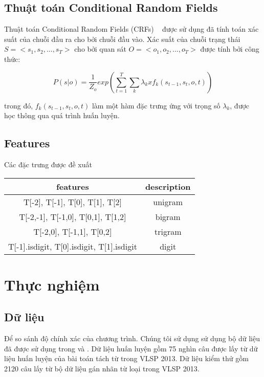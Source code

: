 \documentclass[11pt,a4paper]{article}
\begin{document}
\subsection{Thuật toán Conditional Random Fields}

Thuật toán Conditional Random Fields (CRFs) ~\cite{Lafferty:2001:CRF:645530.655813} được sử dụng đã tính toán xác suất của chuỗi đầu ra cho bởi chuỗi đầu vào. Xác suất của chuỗi trạng thái $S = <s_1, s_2,..., s_T>$ cho bởi quan sát $O = <o_1, o_2, ..., o_T>$ được tính bởi công thức:

$$P(s|o) = \frac{1}{Z_o} exp( \sum_{t=1}^{T} \sum_{k} \lambda_k x f_k (s_{t-1},s_t,o,t) )$$

trong đó, $f_k (s_{t-1},s_t,o,t)$ làm một hàm đặc trưng ứng với trọng số $\lambda_k$, được học thông qua quá trình huấn luyện.

\subsection{Features}

Các đặc trưng được đề xuất

\begin{center}
\begin{tabular}{ |c|c| }
 \hline
 features & description \\
 \hline
 T[-2], T[-1], T[0], T[1], T[2] & unigram  \\
 T[-2,-1], T[-1,0], T[0,1], T[1,2] & bigram  \\
 T[-2,0], T[-1,1], T[0,2] & trigram \\
 T[-1].isdigit, T[0].isdigit, T[1].isdigit & digit
 \hline
\end{tabular}
\end{center}

\section{Thực nghiệm}

\subsection{Dữ liệu}

Để so sánh độ chính xác của chương trình. Chúng tôi sử dụng sử dụng bộ dữ liệu đã được sử dụng trong \citet{DBLP:conf/lrec/NguyenNVDJ18} và \citet{7800279}. Dữ liệu huấn luyện gồm 75 nghìn câu được lấy từ dữ liệu huấn luyện của bài toán tách từ trong VLSP 2013. Dữ liệu kiểm thử gồm 2120 câu lấy từ bộ dữ liệu gán nhãn từ loại trong VLSP 2013.
\end{document}

